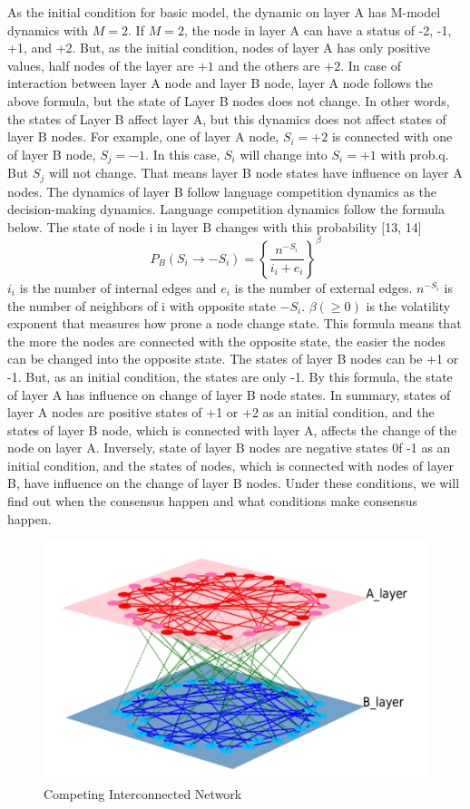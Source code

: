 \documentclass[english]{cccconf}
\begin{document}
As the initial condition for basic model, the dynamic on layer A has M-model dynamics with $M = 2$. If $M = 2$, the node in layer A  can have a status of -2, -1, +1, and +2. But, as the initial condition, nodes of layer A has only positive values, half nodes of the layer are $+1$ and the others are $+2$. In case of interaction between layer A node and layer B node, layer A node follows the above formula, but the state of Layer B nodes does not change. In other words, the states of Layer B affect layer A, but this dynamics does not affect states of layer B nodes. For example, one of layer A node, $S_i = +2$ is connected with one of layer B node, $S_j = -1$. In this case, $S_i$ will change into $S_i = +1$ with prob.q. But $S_j$ will not change. That means layer B node states have influence on layer A nodes.
The dynamics of layer B follow language competition dynamics as the decision-making dynamics. Language competition dynamics follow the formula below. The state of node i in layer B changes with this probability [13, 14]
\begin{equation}
P_B(S_i \rightarrow -S_i)= \left \{\frac{n^{-S_i}}{i_i + e_i}\right \}^\beta
\end{equation}
$i_i$ is the number of internal edges and $e_i$ is the number of external edges. $n^{-S_i}$ is the number of neighbors of i with opposite state $-S_i$. $\beta(\geq 0)$ is the volatility exponent that measures how prone a node change state. This formula means that the more the nodes are connected with the opposite state, the easier the nodes can be changed into the opposite state.
The states of layer B nodes can be +1 or -1. But, as an initial condition, the states are only -1. By this formula, the state of layer A has influence on change of layer B node states.
In summary, states of layer A nodes are positive states of +1 or +2 as an initial condition, and the states of layer B node, which is connected with layer A, affects the change of the node on layer A. Inversely, state of layer B nodes are negative states 0f -1 as an initial condition, and the states of nodes, which is connected with nodes of layer B, have influence on the change of layer B nodes. Under these conditions, we will find out when the consensus happen and what conditions make consensus happen.
\begin{figure}[!htb]
  \centering
  \includegraphics[width=\hsize]{FIG1.png}
  \caption{Competing Interconnected Network}
  \label{Fig1}
\end{figure}
\end{document}
